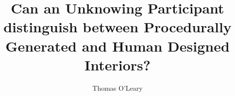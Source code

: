 \documentclass[journal]{IEEEtran}
\begin{document}
\title{Can an Unknowing Participant distinguish between Procedurally Generated and Human Designed Interiors?}

\author{Thomas O'Leary}

\maketitle

















\end{document}

